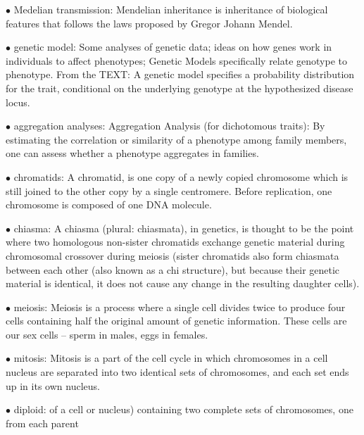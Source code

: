 \documentclass{article}
\begin{document}
\vspace{0.1in}
$\bullet$ Medelian transmission:
Mendelian inheritance is inheritance of biological features that follows the laws proposed by Gregor Johann Mendel.



\vspace{0.1in}
$\bullet$ genetic model:
Some analyses of genetic data; ideas on how genes work in individuals to affect phenotypes;
Genetic Models specifically relate genotype to phenotype.
From the TEXT: A genetic model specifies a probability distribution for the trait, conditional on the underlying genotype at the hypothesized disease locus.


\vspace{0.1in}
$\bullet$ aggregation analyses:
Aggregation Analysis (for dichotomous traits): By estimating the correlation or
similarity of a phenotype among family members, one can assess whether a phenotype
aggregates in families.


\vspace{0.1in}
$\bullet$ chromatids:
A chromatid, is one copy of a newly copied chromosome which is still joined to the other copy by a single centromere. Before replication, one chromosome is composed of one DNA molecule.


\vspace{0.1in}
$\bullet$ chiasma:
A chiasma (plural: chiasmata), in genetics, is thought to be the point where two homologous non-sister chromatids exchange genetic material during chromosomal crossover during meiosis (sister chromatids also form chiasmata between each other (also known as a chi structure), but because their genetic material is identical, it does not cause any change in the resulting daughter cells). 


\vspace{0.1in}
$\bullet$ meiosis:
Meiosis is a process where a single cell divides twice to produce four cells containing half the original amount of genetic information. These cells are our sex cells – sperm in males, eggs in females.


\vspace{0.1in}
$\bullet$ mitosis:
Mitosis is a part of the cell cycle in which chromosomes in a cell nucleus are separated into two identical sets of chromosomes, and each set ends up in its own nucleus.


\vspace{0.1in}
$\bullet$ diploid:
of a cell or nucleus) containing two complete sets of chromosomes, one from each parent
\end{document}
